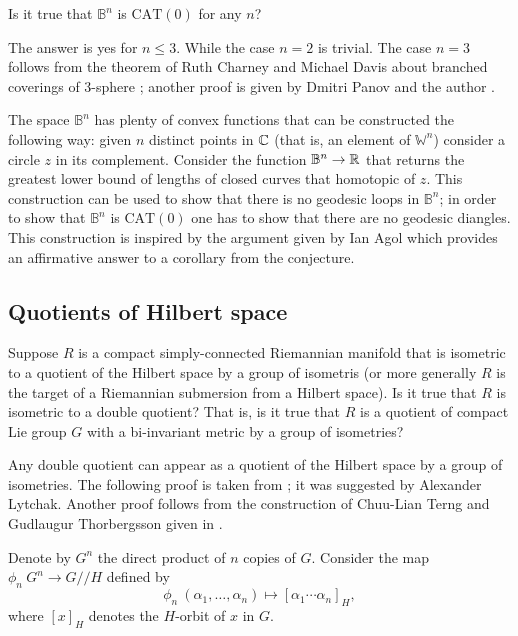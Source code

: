 \begin{pr}
Is it true that $\mathbb{B}^n$ is $\mathrm{CAT}(0)$ for any $n$? 
\end{pr}

The answer is yes for $n\le 3$.
While the case $n=2$ is trivial.
The case $n=3$ follows from the theorem of Ruth Charney and Michael Davis about branched coverings of 3-sphere \cite{charney-davis};
another proof is given by Dmitri Panov and the author \cite{panov-petrunin-ramification}.

The space $\mathbb{B}^n$ has plenty of convex functions that can be constructed the following way:
given $n$ distinct points in $\mathbb{C}$ (that is, an element of $\mathbb{W}^n$) consider a circle $z$ in its complement.
Consider the function $\mathbb{B}^n\to \mathbb{R}$  that returns the greatest lower bound of lengths of closed curves that homotopic of $z$. 
This construction can be used to show that there is no geodesic loops in $\mathbb{B}^n$;
in order to show that $\mathbb{B}^n$ is $\mathrm{CAT}(0)$ one has to show that there are no geodesic diangles.
This construction is inspired by the argument given by Ian Agol \cite{agol-braid} which provides an affirmative answer to a corollary from the conjecture. 

\subsection*{Quotients of Hilbert space}

\begin{pr} Suppose $R$ is a compact simply-connected Riemannian manifold that is isometric to a quotient of the Hilbert space by a group of isometris (or more generally $R$ is the target of a Riemannian submersion from a Hilbert space).
Is it true that $R$ is isometric to a double quotient?
That is, is it true that $R$ is a quotient of compact Lie group $G$ with a bi-invariant metric by a group of isometries?
 
\end{pr}

Any double quotient can appear as a quotient of the Hilbert space by a group of isometries.
The following proof is taken from \cite{lebedeva-petrunin-zolotov}; it was suggested by Alexander Lytchak.
Another proof follows from the construction of Chuu-Lian Terng and Gudlaugur Thorbergsson given in \cite[Section 4]{terng-thorbergsson}.

Denote by $G^n$ the direct product of $n$ copies of $G$.
Consider the map $\phi_n\:G^n\to G/\!\!/H$ defined by
\[\phi_n\:(\alpha_1,\dots,\alpha_n)\mapsto [\alpha_1\cdots\alpha_n]_H,\]
where $[x]_H$ denotes the $H$-orbit of $x$ in $G$.

